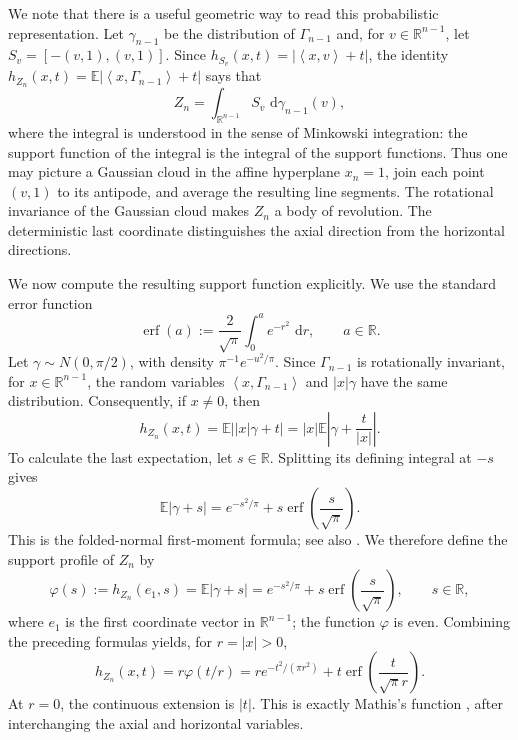 \documentclass[11pt]{article}
\theoremstyle{definition}
\theoremstyle{remark}
\newcommand{\R}{\mathbb R}
\newcommand{\dd}{\,\mathrm d}
\newcommand{\E}{\mathbb E}
\newcommand{\abs}[1]{\left|#1\right|}
\newcommand{\ip}[2]{\left\langle #1,#2\right\rangle}
\newcommand{\erf}{\operatorname{erf}}
\begin{document}
We note that there is a useful geometric way to read this probabilistic
representation.  Let $\gamma_{n-1}$ be the distribution of
$\Gamma_{n-1}$ and, for $v\in\R^{n-1}$, let
$S_v=[-(v,1),(v,1)]$. 
 Since $h_{S_v}(x,t)=\abs{\ip{x}{v}+t}$, the identity
$h_{Z_n}(x,t)=\E\abs{\ip{x}{\Gamma_{n-1}}+t}$ says that
\begin{equation}\label{randomzon}
 Z_n=\int_{\R^{n-1}}S_v\,\dd\gamma_{n-1}(v),
\end{equation}
where the integral is understood in the sense of Minkowski integration:
the support function of the integral is the integral of the support
functions.  Thus one may picture a Gaussian cloud in the affine
hyperplane $x_n=1$, join each point $(v,1)$ to its antipode, and
average the resulting line segments.  The rotational invariance of
the Gaussian cloud makes $Z_n$ a body of revolution.   The
deterministic last coordinate distinguishes the axial direction from
the horizontal directions.  

We now compute the resulting support
function explicitly. We use the standard error function
\begin{equation}\label{eq:erf-definition}
 \erf(a):=\frac2{\sqrt\pi}\int_0^a e^{-r^2}\,\dd r,
 \qquad a\in\R.
\end{equation}
Let $\gamma\sim N(0,\pi/2)$, with density
$\pi^{-1}e^{-u^2/\pi}$.  Since $\Gamma_{n-1}$ is rotationally
invariant, for $x\in\R^{n-1}$, the random variables
$\ip{x}{\Gamma_{n-1}}$ and $|x|\gamma$ have the same distribution.
Consequently, if $x\not =0$, then
\[
 h_{Z_n}(x,t)
 =\E\abs{|x|\gamma+t}
 =|x|\E\abs{\gamma+\frac{t}{|x|}}.
\]
To calculate the last expectation, let $s\in\R$.  Splitting its
defining integral at $-s$ gives
\begin{equation}\label{eq:folded-normal}
 \E\abs{\gamma+s}
 =e^{-s^2/\pi}+s\erf\!\left(\frac{s}{\sqrt\pi}\right).
\end{equation}
This is the folded-normal first-moment formula; see also
\cite{LeoneNelsonNottingham1961}.  We therefore define the support
profile of $Z_n$ by
\begin{equation}\label{eq:phi-definition}
 \varphi(s)
 :=h_{Z_n}(e_1,s)
 =\E\abs{\gamma+s}
 =e^{-s^2/\pi}+s\erf\!\left(\frac{s}{\sqrt\pi}\right),
 \qquad s\in\R,
\end{equation}
where $e_1$ is the first coordinate vector in $\R^{n-1}$; the
function $\varphi$ is even.  Combining the preceding formulas yields,
for $r=\abs{x}>0$,
\begin{equation}\label{eq:Zn-profile}
 h_{Z_n}(x,t)=r\varphi(t/r)
 =r e^{-t^2/(\pi r^2)}
 +t\erf\!\left(\frac{t}{\sqrt\pi r}\right).
\end{equation}
At $r=0$, the continuous extension is $\abs t$.  This is exactly
Mathis's function 
\cite[equation~(2.12)]{Mathis2025}, after interchanging the axial and
horizontal variables.
\end{document}
